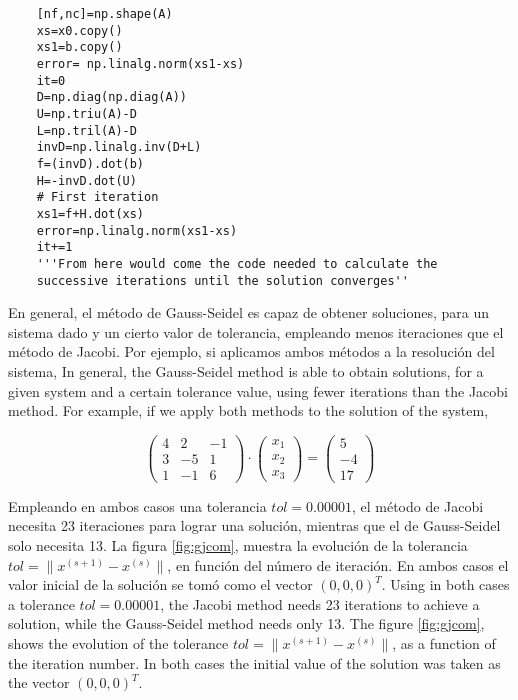 \begin{verbatim}
    [nf,nc]=np.shape(A)
    xs=x0.copy()
    xs1=b.copy()
    error= np.linalg.norm(xs1-xs)
    it=0
    D=np.diag(np.diag(A))
    U=np.triu(A)-D
    L=np.tril(A)-D
    invD=np.linalg.inv(D+L)
    f=(invD).dot(b)
    H=-invD.dot(U)
    # First iteration
    xs1=f+H.dot(xs)
    error=np.linalg.norm(xs1-xs)
    it+=1
    '''From here would come the code needed to calculate the 
    successive iterations until the solution converges''

\end{verbatim}
\begin{paracol}{2}
En general, el método de Gauss-Seidel es capaz de obtener soluciones, para un sistema dado y un cierto valor de tolerancia, empleando menos iteraciones que el método de Jacobi. Por ejemplo, si aplicamos ambos métodos a la resolución del sistema,
\switchcolumn
In general, the Gauss-Seidel method is able to obtain solutions, for a given system and a certain tolerance value, using fewer iterations than the Jacobi method. For example, if we apply both methods to the solution of the system,
\end{paracol}

\begin{equation*}
\begin{pmatrix}
4& 2& -1\\
3& -5& 1\\
1& -1& 6
\end{pmatrix}\cdot \begin{pmatrix}
x_1\\
x_2\\
x_3
\end{pmatrix}=\begin{pmatrix}
5\\
-4\\
17
\end{pmatrix}
\end{equation*}
\begin{paracol}{2}
Empleando en ambos casos una tolerancia $tol=0.00001$, el método de Jacobi necesita 23 iteraciones para lograr una solución, mientras que el de Gauss-Seidel solo necesita 13. La figura \ref{fig:gjcom}, muestra la evolución de la tolerancia $tol=\lVert x^{(s+1)}-x^{(s)} \rVert$, en función del número de iteración. En ambos casos el valor inicial de la solución se tomó como el vector $(0,0,0)^T$.
\switchcolumn
Using in both cases a tolerance $tol=0.00001$, the Jacobi method needs 23 iterations to achieve a solution, while the Gauss-Seidel method needs only 13. The figure \ref{fig:gjcom}, shows the evolution of the tolerance $tol=\lVert x^{(s+1)}-x^{(s)} \rVert$, as a function of the iteration number. In both cases the initial value of the solution was taken as the vector $(0,0,0)^T$.
\end{paracol}


